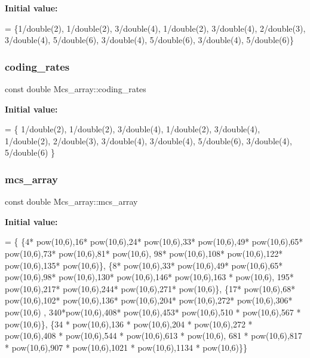 {\bfseries Initial value\+:}
\begin{DoxyCode}
= \{1/double(2), 1/double(2), 3/double(4), 1/double(2),
    3/double(4), 2/double(3), 3/double(4), 5/double(6), 3/double(4), 5/double(6), 3/double(4), 5/double(6)\}
\end{DoxyCode}
\mbox{\label{structMcs__array_a16b9cd21a380a8155fd31d6151ba23a1}} 
\subsubsection{\texorpdfstring{coding\+\_\+rates}{coding\_rates}}
{\footnotesize\ttfamily const double Mcs\+\_\+array\+::coding\+\_\+rates\hspace{0.3cm}{\ttfamily [static]}}

{\bfseries Initial value\+:}
\begin{DoxyCode}
= \{ 
    1/double(2),    
    1/double(2),    
    3/double(4),    
    1/double(2),    
    3/double(4),    
    1/double(2),    
    2/double(3),    
    3/double(4),    
    3/double(4),    
    5/double(6),    
    3/double(4),    
    5/double(6)     
\}
\end{DoxyCode}
\mbox{\label{structMcs__array_aa65862049737b2d20059c0b9d6439639}} 
\subsubsection{\texorpdfstring{mcs\+\_\+array}{mcs\_array}}
{\footnotesize\ttfamily const double Mcs\+\_\+array\+::mcs\+\_\+array\hspace{0.3cm}{\ttfamily [static]}}

{\bfseries Initial value\+:}
\begin{DoxyCode}
= \{ 
    \{4* pow(10,6),16* pow(10,6),24* pow(10,6),33* pow(10,6),49* pow(10,6),65* pow(10,6),73* pow(10,6),81* 
      pow(10,6),
            98* pow(10,6),108* pow(10,6),122* pow(10,6),135* pow(10,6)\},
    \{8* pow(10,6),33* pow(10,6),49* pow(10,6),65* pow(10,6),98* pow(10,6),130* pow(10,6),146* pow(10,6),163
      * pow(10,6),
            195* pow(10,6),217* pow(10,6),244* pow(10,6),271* pow(10,6)\},
    \{17* pow(10,6),68* pow(10,6),102* pow(10,6),136* pow(10,6),204* pow(10,6),272* pow(10,6),306* pow(10,6)
      ,
            340*pow(10,6),408* pow(10,6),453* pow(10,6),510 * pow(10,6),567 * pow(10,6)\},
    \{34 * pow(10,6),136 * pow(10,6),204 * pow(10,6),272 * pow(10,6),408 * pow(10,6),544 * pow(10,6),613 * 
      pow(10,6),
            681 * pow(10,6),817 * pow(10,6),907 * pow(10,6),1021 * pow(10,6),1134 * pow(10,6)\}\}
\end{DoxyCode}
\mbox{\label{structMcs__array_a6c8e5de2869bf2c1fa707f6ad7d4b968}} 
